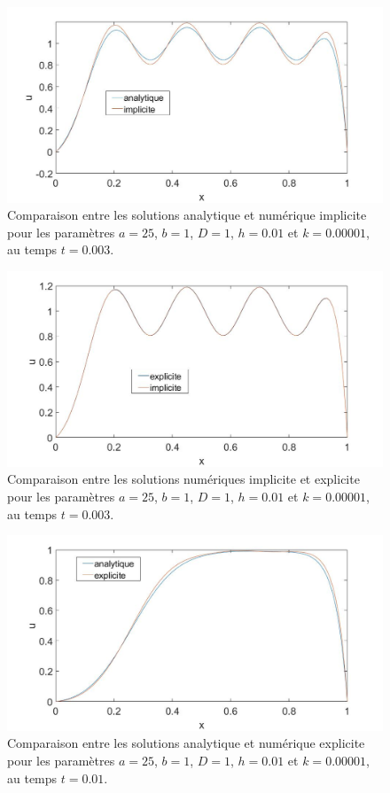 \documentclass[a4paper, 12pt]{report}
\begin{document}
\begin{figure}[H]
  \center
  \includegraphics[scale=0.4]{images/analy_vs_impl_t_end_0dot003.jpg}
  \caption{Comparaison entre les solutions analytique et numérique implicite pour
  les paramètres $a=25$, $b=1$, $D=1$, $h=0.01$ et $k=0.00001$, au temps $t=0.003$.}
\end{figure}

\begin{figure}[H]
  \center
  \includegraphics[scale=0.4]{images/expl_vs_impl_t_end_0dot003.jpg}
  \caption{Comparaison entre les solutions numériques implicite et explicite pour
  les paramètres $a=25$, $b=1$, $D=1$, $h=0.01$ et $k=0.00001$, au temps $t=0.003$.}
  \label{eq:expl_vs_impl_t0dot003}
\end{figure}

\begin{figure}[H]
  \center
  \includegraphics[scale=0.4]{images/analy_vs_expl_t_end_0dot01.jpg}
  \caption{Comparaison entre les solutions analytique et numérique explicite pour
  les paramètres $a=25$, $b=1$, $D=1$, $h=0.01$ et $k=0.00001$, au temps $t=0.01$.}
\end{figure}
\end{document}
